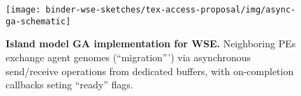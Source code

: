 \begin{figure}
  \centering
\texttt{[image: binder-wse-sketches/tex-access-proposal/img/async-ga-schematic]}
  \caption{%
  \textbf{Island model GA implementation for WSE.}
  Neighboring PEs exchange agent genomes (``migration''') via asynchronous send/receive operations from dedicated buffers, with on-completion callbacks seting ``ready'' flags.
  }
  \label{fig:async-ga-schematic}
  \vspace{-0.2in}
\end{figure}
